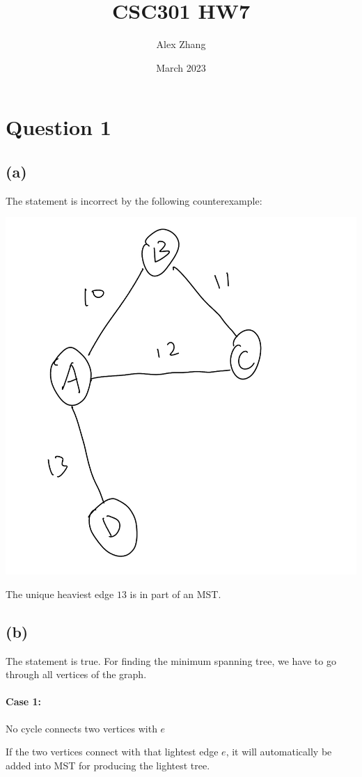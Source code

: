 \documentclass{article}
\title{CSC301 HW7}
\author{Alex Zhang}
\date{March 2023}
\begin{document}
\maketitle
\section*{Question 1}
\subsection*{(a)}
The statement is incorrect by the following counterexample:
\begin{center}
    \includegraphics[scale = 0.2]{q1.jpg}
\end{center}
The unique heaviest edge $13$ is in part of an MST.
\subsection*{(b)}
The statement is true. For finding the minimum spanning tree, we have to go through all vertices of the graph.
\paragraph*{Case 1:} No cycle connects two vertices with $e$

If the two vertices connect with that lightest edge $e$, it will automatically be added into MST for producing the lightest
tree.
\end{document}
